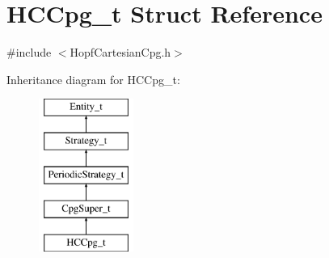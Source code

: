 \hypertarget{structHCCpg__t}{
\section{HCCpg\_\-t Struct Reference}
\label{structHCCpg__t}
}


{\ttfamily \#include $<$HopfCartesianCpg.h$>$}

Inheritance diagram for HCCpg\_\-t:\begin{figure}[H]
\begin{center}
\leavevmode
\includegraphics[height=5.000000cm]{structHCCpg__t}
\end{center}
\end{figure}
